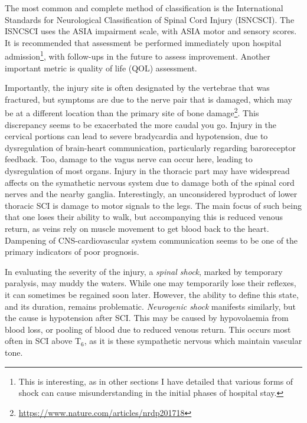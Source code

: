 \documentclass[12pt]{report}
\begin{document}
The most common and complete method of classification is the International Standards for Neurological Classification of Spinal Cord Injury (ISNCSCI). The ISNCSCI uses the ASIA impairment scale, with ASIA motor and sensory scores. It is recommended that assessment be performed immediately upon hospital admission\footnote{This is interesting, as in other sections I have detailed that various forms of shock can cause misunderstanding in the initial phases of hospital stay.}, with follow-ups in the future to assess improvement. Another important metric is quality of life (QOL) assessment.\newline 

Importantly, the injury site is often designated by the vertebrae that was fractured, but symptoms are due to the nerve pair that is damaged, which may be at a different location than the primary site of bone damage\footnote{\url{https://www.nature.com/articles/nrdp201718}}. This discrepancy seems to be exacerbated the more caudal you go. Injury in the cervical portions can lead to severe bradycardia and hypotension, due to dysregulation of brain-heart communication, particularly regarding baroreceptor feedback. Too, damage to the vagus nerve can occur here, leading to dysregulation of most organs. Injury in the thoracic part may have widespread affects on the symathetic nervous system due to damage both of the spinal cord nerves and the nearby ganglia. Interestingly, an unconsidered byproduct of lower thoracic SCI is damage to motor signals to the legs. The main focus of such being that one loses their ability to walk, but accompanying this is reduced venous return, as veins rely on muscle movement to get blood back to the heart. Dampening of CNS-cardiovascular system communication seems to be one of the primary indicators of poor prognosis.\newline

In evaluating the severity of the injury, a \textit{spinal shock}, marked by temporary paralysis, may muddy the waters. While one may temporarily lose their reflexes, it can sometimes be regained soon later. However, the ability to define this state, and its duration, remains problematic. \textit{Neurogenic shock} manifests similarly, but the cause is hypotension after SCI. This may be caused by hypovolaemia from blood loss, or pooling of blood due to reduced venous return. This occurs most often in SCI above T$_6$, as it is these sympathetic nervous which maintain vascular tone.\newline
\end{document}
